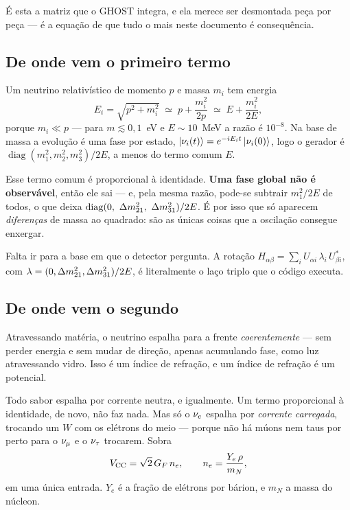 É esta a matriz que o GHOST integra, e ela merece ser desmontada peça por peça
--- é a equação de que tudo o mais neste documento é consequência.

\subsection{De onde vem o primeiro termo}

Um neutrino relativístico de momento $p$ e massa $m_i$ tem energia
\begin{equation}
  E_i = \sqrt{p^2 + m_i^2} \;\simeq\; p + \frac{m_i^2}{2p}
   \;\simeq\; E + \frac{m_i^2}{2E},
\end{equation}
porque $m_i \ll p$ --- para $m \lesssim 0{,}1$~eV e $E \sim 10$~MeV a razão é
$10^{-8}$. Na base de massa a evolução é uma fase por estado,
$\left|\nu_i(t)\right\rangle = e^{-iE_i t}\left|\nu_i(0)\right\rangle$, logo o gerador é
$\operatorname{diag}(m_1^2, m_2^2, m_3^2)/2E$, a menos do termo comum $E$.

Esse termo comum é proporcional à identidade. \textbf{Uma fase global não é
observável}, então ele sai --- e, pela mesma razão, pode-se subtrair
$m_1^2/2E$ de todos, o que deixa
$\operatorname{diag}(0,\ \dm{21},\ \dm{31})/2E$. É por isso que só aparecem
\emph{diferenças} de massa ao quadrado: são as únicas coisas que a oscilação
consegue enxergar.

Falta ir para a base em que o detector pergunta. A rotação
$H_{\alpha\beta} = \sum_i U_{\alpha i}\,\lambda_i\,U^{*}_{\beta i}$, com
$\lambda = (0, \Delta m^2_{21}, \Delta m^2_{31})/2E$, é literalmente o laço triplo que o código
executa.

\subsection{De onde vem o segundo}

Atravessando matéria, o neutrino espalha para a frente \emph{coerentemente} ---
sem perder energia e sem mudar de direção, apenas acumulando fase, como luz
atravessando vidro. Isso é um índice de refração, e um índice de refração é um
potencial.

Todo sabor espalha por corrente neutra, e igualmente. Um termo proporcional à
identidade, de novo, não faz nada. Mas só o $\nu_e$ espalha por \emph{corrente
carregada}, trocando um $W$ com os elétrons do meio --- porque não há múons nem
taus por perto para o $\nu_\mu$ e o $\nu_\tau$ trocarem. Sobra
\begin{equation}
  V_{\rm CC} = \sqrt{2}\,G_F\,n_e,
  \qquad n_e = \frac{Y_e\,\rho}{m_N},
\end{equation}
em uma única entrada. $Y_e$ é a fração de elétrons por bárion, e $m_N$ a massa
do núcleon.

